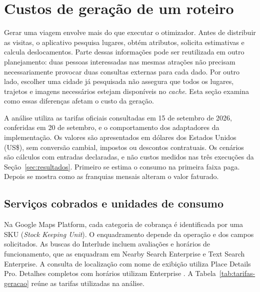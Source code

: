 \section{Custos de geração de um roteiro}
\label{sec:custos-geracao}

Gerar uma viagem envolve mais do que executar o otimizador. Antes de distribuir as visitas, o aplicativo pesquisa lugares, obtém atributos, solicita estimativas e calcula deslocamentos. Parte dessas informações pode ser reutilizada em outro planejamento: duas pessoas interessadas nas mesmas atrações não precisam necessariamente provocar duas consultas externas para cada dado. Por outro lado, escolher uma cidade já pesquisada não assegura que todos os lugares, trajetos e imagens necessários estejam disponíveis no \textit{cache}. Esta seção examina como essas diferenças afetam o custo da geração.

A análise utiliza as tarifas oficiais consultadas em 15 de setembro de 2026, conferidas em 20 de setembro, e o comportamento dos adaptadores da implementação. Os valores são apresentados em dólares dos Estados Unidos (US\$), sem conversão cambial, impostos ou descontos contratuais. Os cenários são cálculos com entradas declaradas, e não custos medidos nas três execuções da Seção~\ref{sec:resultados}. Primeiro se estima o consumo na primeira faixa paga. Depois se mostra como as franquias mensais alteram o valor faturado.

\subsection{Serviços cobrados e unidades de consumo}

Na Google Maps Platform, cada categoria de cobrança é identificada por uma SKU (\textit{Stock Keeping Unit}). O enquadramento depende da operação e dos campos solicitados. As buscas do Interlude incluem avaliações e horários de funcionamento, que as enquadram em Nearby Search Enterprise e Text Search Enterprise. A consulta de localização com nome de exibição utiliza Place Details Pro. Detalhes completos com horários utilizam Enterprise \cite{google_places_campos2026}. A Tabela~\ref{tab:tarifas-geracao} reúne as tarifas utilizadas na análise.

